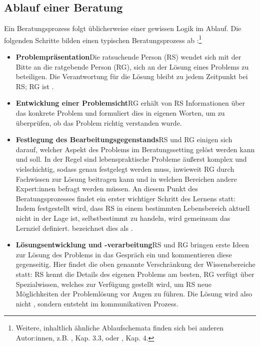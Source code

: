 \documentclass[
  twoside,
  parskip=half-,
]{scrreprt}
\begin{document}
\subsection{Ablauf einer Beratung}
Ein Beratungsprozess folgt üblicherweise einer gewissen Logik im Ablauf.  Die folgenden Schritte bilden einen typischen Beratungsprozess ab \autocite[vgl. Kallmeyer 1985, zit. nach][179]{dinkelaker}:\footnote{Weitere, inhaltlich ähnliche Ablaufschemata finden sich bei anderen Autor:innen, z.B. \citeauthor{weinberger}, Kap. 3.3, oder \citeauthor{hacker2021}, Kap. 4.}
\begin{itemize}
  \item \textbf{Problempräsentation}\quad Die ratsuchende Person (RS) wendet sich mit der Bitte an die ratgebende Person (RG), sich an der Lösung eines Problems zu beteiligen. Die Verantwortung für die Lösung bleibt zu jedem Zeitpunkt bei RS; RG ist .
  \item \textbf{Entwicklung einer Problemsicht}\quad RG erhält von RS Informationen über das konkrete Problem und formuliert dies in eigenen Worten, um zu überprüfen, ob das Problem richtig verstanden wurde.
  \item \textbf{Festlegung des Bearbeitungsgegenstands}\quad RS und RG einigen sich darauf, welcher Aspekt des Problems im Beratungssetting gelöst werden kann und soll. In der Regel sind lebenspraktische Probleme äußerst komplex und vielschichtig, sodass genau festgelegt werden muss, inwieweit RG durch Fachwissen zur Lösung beitragen kann und in welchen Bereichen andere Expert:innen befragt werden müssen. An diesem Punkt des Beratungsprozesses findet ein erster wichtiger Schritt des Lernens statt: Indem festgestellt wird, dass RS in einem bestimmten Lebensbereich aktuell nicht in der Lage ist, selbstbestimmt zu handeln, wird gemeinsam das Lernziel definiert. \citeauthor{dinkelaker} bezeichnet dies als .
  \item \textbf{Lösungsentwicklung und -verarbeitung}\quad RS und RG bringen erste Ideen zur Lösung des Problems in das Gespräch ein und kommentieren diese gegenseitig. Hier findet die oben genannte Verschränkung der Wissensbereiche statt: RS kennt die Details des eigenen Problems am besten, RG verfügt über Spezialwissen, welches zur Verfügung gestellt wird, um RS neue Möglichkeiten der Problemlösung vor Augen zu führen. Die Lösung wird also nicht , sondern entsteht im kommunikativen Prozess.

\end{itemize}
\end{document}

